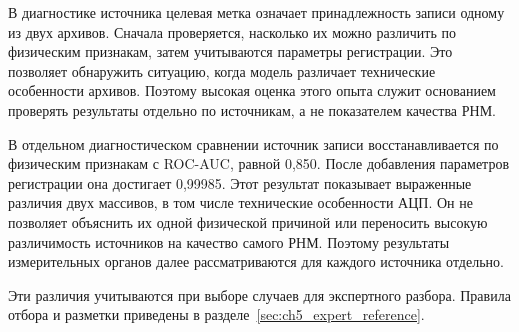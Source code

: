 {}

В диагностике источника целевая метка означает принадлежность
записи одному из двух архивов. Сначала проверяется, насколько
их можно различить по физическим признакам, затем учитываются
параметры регистрации. Это позволяет обнаружить ситуацию,
когда модель различает технические особенности архивов.
Поэтому высокая оценка этого опыта служит основанием проверять
результаты отдельно по источникам, а не показателем качества РНМ.

В отдельном диагностическом сравнении
источник записи восстанавливается по физическим признакам
с ROC-AUC, равной 0,850.
После добавления параметров регистрации она достигает 0,99985.
Этот результат показывает выраженные различия двух массивов,
в том числе технические особенности АЦП.
Он не позволяет объяснить их одной физической причиной
или переносить высокую различимость источников
на качество самого РНМ.
Поэтому результаты измерительных органов
далее рассматриваются для каждого источника отдельно.

Эти различия учитываются при выборе случаев для экспертного разбора. Правила отбора и
разметки приведены в разделе~\ref{sec:ch5_expert_reference}.
